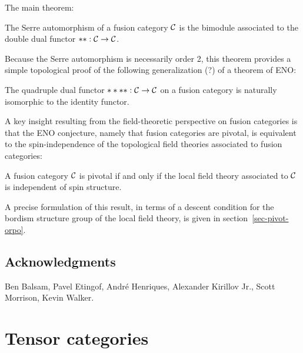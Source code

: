 \documentclass{amsart}
\begin{document}
The main theorem:
\begin{theorem}
The Serre automorphism of a fusion category $\mathcal C$ is the bimodule associated to the double dual functor $**: \mathcal C \rightarrow \mathcal C$.
\end{theorem}

Because the Serre automorphism is necessarily order 2, this theorem provides a simple topological proof of the following generalization (?) of a theorem of ENO:
\begin{corollary}
The quadruple dual functor $****: \mathcal C \rightarrow \mathcal C$ on a fusion category is naturally isomorphic to the identity functor.
\end{corollary}

A key insight resulting from the field-theoretic perspective on fusion categories is that the ENO conjecture, namely that fusion categories are pivotal, is equivalent to the spin-independence of the topological field theories associated to fusion categories:
\begin{theorem}
A fusion category $\mathcal C$ is pivotal if and only if the local field theory associated to $\mathcal C$ is independent of spin structure.
\end{theorem}
A precise formulation of this result, in terms of a descent condition for the bordism structure group of the local field theory, is given in section~\ref{sec-pivot-orpo}.



\subsection*{Acknowledgments}
Ben Balsam, Pavel Etingof, Andr\'e Henriques, Alexander Kirillov Jr., Scott Morrison, Kevin Walker.



\section{Tensor categories} \label{sec-tc}

\end{document}
